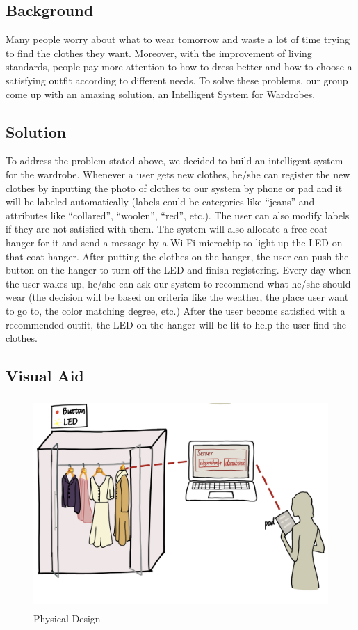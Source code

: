 \subsection{Background}  
Many people worry about what to wear tomorrow and waste a lot of time trying to find the clothes they want. Moreover, with the improvement of living standards, people pay more attention to how to dress better and how to choose a satisfying outfit according to different needs. To solve these problems, our group come up with an amazing solution, an Intelligent System for Wardrobes.

\subsection{Solution}
To address the problem stated above, we decided to build an intelligent system for the wardrobe. Whenever a user gets new clothes, he/she can register the new clothes by inputting the photo of clothes to our system by phone or pad and it will be labeled automatically (labels could be categories like “jeans” and attributes like “collared”, “woolen”, “red”, etc.). The user can also modify labels if they are not satisfied with them. The system will also allocate a free coat hanger for it and send a message by a Wi-Fi microchip to light up the LED on that coat hanger. After putting the clothes on the hanger, the user can push the button on the hanger to turn off the LED and finish registering. Every day when the user wakes up, he/she can ask our system to recommend what he/she should wear (the decision will be based on criteria like the weather, the place user want to go to, the color matching degree, etc.) After the user become satisfied with a recommended outfit, the LED on the hanger will be lit to help the user find the clothes.

\subsection{Visual Aid}

\begin{figure}[h]
   \centering
   \includegraphics[width=13cm,height=8cm]{graph/physical design.jpg}
   \caption{Physical Design}
   \end{figure}

